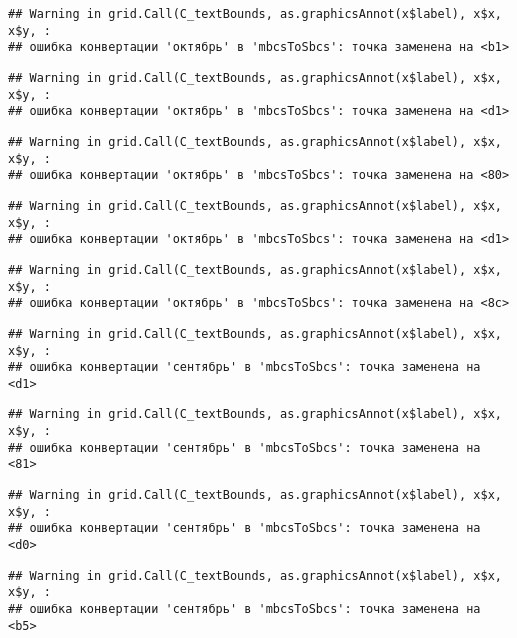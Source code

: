 \documentclass[
]{article}
\begin{document}
\begin{verbatim}
## Warning in grid.Call(C_textBounds, as.graphicsAnnot(x$label), x$x, x$y, :
## ошибка конвертации 'октябрь' в 'mbcsToSbcs': точка заменена на <b1>
\end{verbatim}

\begin{verbatim}
## Warning in grid.Call(C_textBounds, as.graphicsAnnot(x$label), x$x, x$y, :
## ошибка конвертации 'октябрь' в 'mbcsToSbcs': точка заменена на <d1>
\end{verbatim}

\begin{verbatim}
## Warning in grid.Call(C_textBounds, as.graphicsAnnot(x$label), x$x, x$y, :
## ошибка конвертации 'октябрь' в 'mbcsToSbcs': точка заменена на <80>
\end{verbatim}

\begin{verbatim}
## Warning in grid.Call(C_textBounds, as.graphicsAnnot(x$label), x$x, x$y, :
## ошибка конвертации 'октябрь' в 'mbcsToSbcs': точка заменена на <d1>
\end{verbatim}

\begin{verbatim}
## Warning in grid.Call(C_textBounds, as.graphicsAnnot(x$label), x$x, x$y, :
## ошибка конвертации 'октябрь' в 'mbcsToSbcs': точка заменена на <8c>
\end{verbatim}

\begin{verbatim}
## Warning in grid.Call(C_textBounds, as.graphicsAnnot(x$label), x$x, x$y, :
## ошибка конвертации 'сентябрь' в 'mbcsToSbcs': точка заменена на <d1>
\end{verbatim}

\begin{verbatim}
## Warning in grid.Call(C_textBounds, as.graphicsAnnot(x$label), x$x, x$y, :
## ошибка конвертации 'сентябрь' в 'mbcsToSbcs': точка заменена на <81>
\end{verbatim}

\begin{verbatim}
## Warning in grid.Call(C_textBounds, as.graphicsAnnot(x$label), x$x, x$y, :
## ошибка конвертации 'сентябрь' в 'mbcsToSbcs': точка заменена на <d0>
\end{verbatim}

\begin{verbatim}
## Warning in grid.Call(C_textBounds, as.graphicsAnnot(x$label), x$x, x$y, :
## ошибка конвертации 'сентябрь' в 'mbcsToSbcs': точка заменена на <b5>
\end{verbatim}
\end{document}
